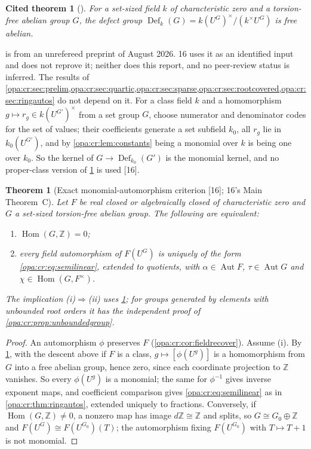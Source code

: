 \documentclass[11pt,oneside]{article}
\numberwithin{equation}{section}
\newtheorem{theorem}{Theorem}[section]
\newtheorem{fact}[fact]{Cited theorem}
\theoremstyle{definition}
\theoremstyle{remark}
\newcommand{\Z}{\mathbb Z}
\newcommand{\Aut}{\operatorname{Aut}}
\newcommand{\Hom}{\operatorname{Hom}}
\newcommand{\src}[1]{\textup{\textsf{\small[#1]}}}
\begin{document}
\begin{fact}[{\cite[Theorem 4.5]{LW}}]\label{opa:cr:fact:LW}
For a set-sized field $k$ of characteristic zero and a torsion-free abelian group $G$, the defect group
$\operatorname{Def}_k(G)=k(U^G)^\times/(k^\times U^G)$ is free abelian.
\end{fact}

 is from an unrefereed preprint of August 2026. 16 uses it as an identified input and does not
reprove it; neither does this report, and no peer-review status is inferred. The results of
\cref{opa:cr:sec:prelim,opa:cr:sec:quartic,opa:cr:sec:sparse,opa:cr:sec:rootcovered,opa:cr:sec:ringautos} do not depend on
it. For a class field $k$ and a homomorphism $g\mapsto r_g\in k(U^{G'})^\times$ from a set group $G$, choose numerator and
denominator codes for the set of values; their coefficients generate a set subfield $k_0$, all $r_g$ lie in
$k_0(U^{G'})$, and by \cref{opa:cr:lem:constants} being a monomial over $k$ is being one over $k_0$. So the kernel of
$G\to\operatorname{Def}_{k_0}(G')$ is the monomial kernel, and no proper-class version of \cref{opa:cr:fact:LW} is used \src{16}.

\begin{theorem}[Exact monomial-automorphism criterion \src{16}; 16's Main Theorem~C]\label{opa:cr:thm:auto}
Let $F$ be real closed or algebraically closed of characteristic zero and $G$ a set-sized torsion-free abelian group.
The following are equivalent:
\begin{enumerate}[label=\textup{(\roman*)},itemsep=1pt]
\item $\Hom(G,\Z)=0$;
\item every field automorphism of $F(U^G)$ is uniquely of the form \eqref{opa:cr:eq:semilinear}, extended to quotients,
with $\alpha\in\Aut F$, $\tau\in\Aut G$ and $\chi\in\Hom(G,F^\times)$.
\end{enumerate}
The implication \textup{(i)$\Rightarrow$(ii)} uses \cref{opa:cr:fact:LW}; for groups generated by elements with unbounded
root orders it has the independent proof of \cref{opa:cr:prop:unboundedgroup}.
\end{theorem}
\begin{proof}
An automorphism $\phi$ preserves $F$ (\cref{opa:cr:cor:fieldrecover}). Assume (i). By \cref{opa:cr:fact:LW}, with the descent
above if $F$ is a class, $g\mapsto[\phi(U^g)]$ is a homomorphism from $G$ into a free abelian group, hence zero, since each
coordinate projection to $\Z$ vanishes. So every $\phi(U^g)$ is a monomial; the same for $\phi^{-1}$ gives inverse exponent
maps, and coefficient comparison gives \eqref{opa:cr:eq:semilinear} as in \cref{opa:cr:thm:ringautos}, extended uniquely to
fractions. Conversely, if $\Hom(G,\Z)\ne0$, a nonzero map has image $d\Z\cong\Z$ and splits, so $G\cong G_0\oplus\Z$ and
$F(U^G)\cong F(U^{G_0})(T)$; the automorphism fixing $F(U^{G_0})$ with $T\mapsto T+1$ is not monomial.
\end{proof}
\end{document}
